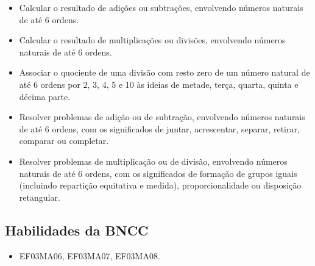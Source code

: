 \begin{itemize}
\item Calcular o resultado de adições ou subtrações, envolvendo números
naturais de até 6 ordens.

\item Calcular o resultado de multiplicações ou divisões, envolvendo números
naturais de até 6 ordens.

\item Associar o quociente de uma divisão com resto zero de um número
natural de até 6 ordens por 2, 3, 4, 5 e 10 às ideias de metade, terça,
quarta, quinta e décima parte.

\item Resolver problemas de adição ou de subtração, envolvendo números
naturais de até 6 ordens, com os significados de juntar, acrescentar,
separar, retirar, comparar ou completar.

\item Resolver problemas de multiplicação ou de divisão, envolvendo números
naturais de até 6 ordens, com os significados de formação de grupos
iguais (incluindo repartição equitativa e medida), proporcionalidade ou
disposição retangular.
\end{itemize}

\subsection{Habilidades da BNCC}

\begin{itemize}
\item EF03MA06, EF03MA07, EF03MA08.
\end{itemize}

\pagebreak

